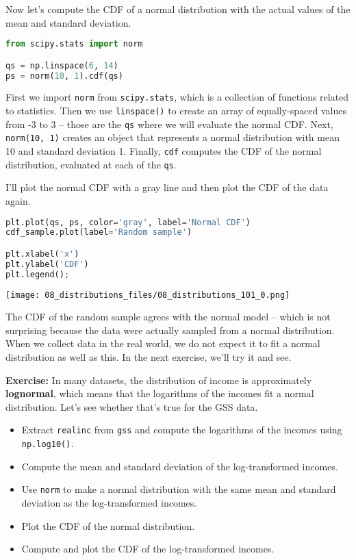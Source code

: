 Now let's compute the CDF of a normal distribution with the actual
values of the mean and standard deviation.

\begin{lstlisting}[language=Python,style=source]
from scipy.stats import norm

qs = np.linspace(6, 14)
ps = norm(10, 1).cdf(qs)
\end{lstlisting}

First we import \passthrough{\lstinline!norm!} from
\passthrough{\lstinline!scipy.stats!}, which is a collection of
functions related to statistics. Then we use
\passthrough{\lstinline!linspace()!} to create an array of
equally-spaced values from -3 to 3 -- those are the
\passthrough{\lstinline!qs!} where we will evaluate the normal CDF.
Next, \passthrough{\lstinline!norm(10, 1)!} creates an object that
represents a normal distribution with mean 10 and standard deviation 1.
Finally, \passthrough{\lstinline!cdf!} computes the CDF of the normal
distribution, evaluated at each of the \passthrough{\lstinline!qs!}.

I'll plot the normal CDF with a gray line and then plot the CDF of the
data again.

\begin{lstlisting}[language=Python,style=source]
plt.plot(qs, ps, color='gray', label='Normal CDF')
cdf_sample.plot(label='Random sample')

plt.xlabel('x')
plt.ylabel('CDF')
plt.legend();
\end{lstlisting}

\begin{center}
\texttt{[image: 08\_distributions\_files/08\_distributions\_101\_0.png]}
\end{center}

The CDF of the random sample agrees with the normal model -- which is
not surprising because the data were actually sampled from a normal
distribution. When we collect data in the real world, we do not expect
it to fit a normal distribution as well as this. In the next exercise,
we'll try it and see.

\textbf{Exercise:} In many datasets, the distribution of income is
approximately \textbf{lognormal}, which means that the logarithms of the
incomes fit a normal distribution. Let's see whether that's true for the
GSS data.

\begin{itemize}
\item
  Extract \passthrough{\lstinline!realinc!} from
  \passthrough{\lstinline!gss!} and compute the logarithms of the
  incomes using \passthrough{\lstinline!np.log10()!}.
\item
  Compute the mean and standard deviation of the log-transformed
  incomes.
\item
  Use \passthrough{\lstinline!norm!} to make a normal distribution with
  the same mean and standard deviation as the log-transformed incomes.
\item
  Plot the CDF of the normal distribution.
\item
  Compute and plot the CDF of the log-transformed incomes.
\end{itemize}

